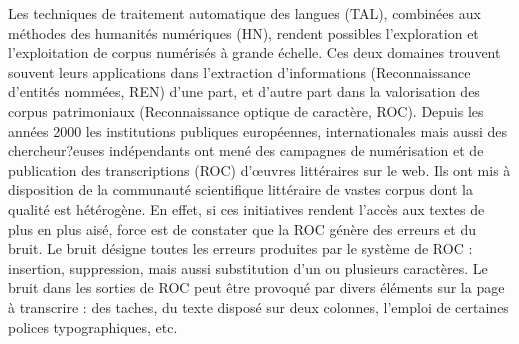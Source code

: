 Les techniques de traitement automatique des langues (TAL), combinées aux méthodes des humanités numériques (HN), rendent possibles l'exploration et l'exploitation de corpus numérisés à grande échelle. Ces deux domaines trouvent souvent leurs applications dans l'extraction d'informations (Reconnaissance d'entités nommées, REN) d'une part, et d'autre part dans la valorisation des corpus patrimoniaux (Reconnaissance optique de caractère, ROC).
Depuis les années 2000 les institutions publiques européennes, internationales mais aussi des chercheur?euses indépendants
ont mené des campagnes de numérisation et de publication des transcriptions (ROC) d’œuvres littéraires sur le web. Ils ont mis à disposition de la communauté scientifique littéraire de vastes corpus dont la qualité est hétérogène.
En effet, si ces initiatives rendent l'accès aux textes de plus en plus aisé, force est de constater que la ROC génère des erreurs et du bruit. Le bruit désigne toutes les erreurs produites par le système de ROC : insertion, suppression, mais aussi substitution d'un ou plusieurs caractères. Le bruit dans les sorties de ROC peut être provoqué par divers éléments sur la page à transcrire : des taches, du texte disposé sur deux colonnes, l'emploi de certaines polices typographiques, etc.


%

